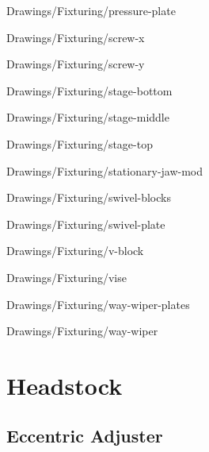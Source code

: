 
{Drawings/Fixturing/pressure-plate}


{Drawings/Fixturing/screw-x}


{Drawings/Fixturing/screw-y}


{Drawings/Fixturing/stage-bottom}


{Drawings/Fixturing/stage-middle}


{Drawings/Fixturing/stage-top}


{Drawings/Fixturing/stationary-jaw-mod}


{Drawings/Fixturing/swivel-blocks}


{Drawings/Fixturing/swivel-plate}


{Drawings/Fixturing/v-block}


{Drawings/Fixturing/vise}


{Drawings/Fixturing/way-wiper-plates}


{Drawings/Fixturing/way-wiper}

\section{Headstock}

\subsection{Eccentric Adjuster}

